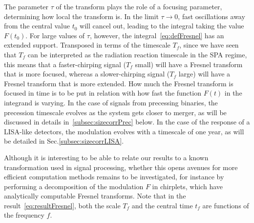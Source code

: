 \documentclass[aps,showpacs,twocolumn,
prd,superscriptaddress,nofootinbib]{revtex4-1}
\newcommand{\tf}{t_{f}}
\newcommand{\Tf}{T_{f}}
\begin{document}
The parameter $\tau$ of the transform plays the role of a focusing parameter, determining how local the transform is. In the limit $\tau\rightarrow 0$, fast oscillations away from the central value $t_{0}$ will cancel out, leading to the integral taking the value $F(t_{0})$. For large values of $\tau$, however, the integral~\eqref{eq:defFresnel} has an extended support. Transposed in terms of the timescale $\Tf$, since we have seen that $\Tf$ can be interpreted as the radiation reaction timescale in the SPA regime, this means that a faster-chirping signal ($\Tf$ small) will have a Fresnel transform that is more focused, whereas a slower-chirping signal ($\Tf$ large) will have a Fresnel transform that is more extended. How much the Fresnel transform is focused in time is to be put in relation with how fast the function $F(t)$ in the integrand is varying. In the case of signals from precessing binaries, the precession timescale evolves as the system gets closer to merger, as will be discussed in details in~\ref{subsec:sizecorrPrec} below. In the case of the response of a LISA-like detectors, the modulation evolves with a timescale of one year, as will be detailed in Sec.\ref{subsec:sizecorrLISA}.

Although it is interesting to be able to relate our results to a known transformation used in signal processing, whether this opens avenues for more efficient computation methods remains to be investigated, for instance by performing a decomposition of the modulation $F$ in chirplets, which have analytically computable Fresnel transforms. Note that in the result~\eqref{eq:resultFresnel}, both the scale $\Tf$ and the central time $\tf$ are functions of the frequency $f$.
\end{document}
